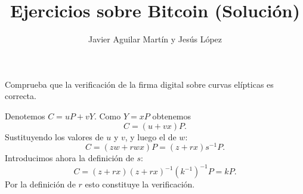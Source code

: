 \documentclass[twoside]{article}
\begin{document}
\title{Ejercicios sobre Bitcoin (Solución)}
\author{Javier Aguilar Martín y Jesús López}
\maketitle


\begin{ejercicio}{1}
Comprueba que la verificación de la firma digital sobre curvas elípticas es correcta. 

\end{ejercicio}
\begin{solucion}
	 Denotemos $C=uP+vY$. Como $Y=xP$ obtenemos $$C=(u+vx)P.$$ Sustituyendo los valores de $u$ y $v$, y luego el de $w$: $$ C=(zw+rwx)P= (z+rx)s^{-1}P.$$ Introducimos ahora la definición de $s$: $$C=(z+rx)(z+rx)^{-1}(k^{-1})^{-1}P=kP.$$ Por la definición de $r$ esto constituye la verificación.
	\end{solucion}
\end{document}
